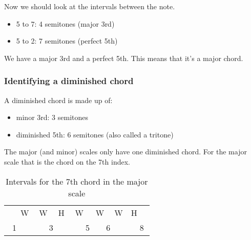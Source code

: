 Now we should look at the intervals between the note.

\begin{itemize}
	\item 5 to 7: 4 semitones (major 3rd)
	\item 5 to 2: 7 semitones (perfect 5th)
\end{itemize}

We have a major 3rd and a perfect 5th. This means that it's a major chord.

\subsubsection{Identifying a diminished chord} \label{sec:identifying_dimished_chords_in_the_scale}

A diminished chord is made up of:

\begin{itemize}
	\item minor 3rd: 3 semitones
	\item diminished 5th: 6 semitones (also called a tritone)
\end{itemize}


The major (and minor) scales only have one diminished chord. For the major scale that is the chord on the 7th index.

\begin{table}[h]
	\centering
	\begin{tabular}{*{16}{c}}
		& \multicolumn{2}{P{4mm}}{\large{W}} & \multicolumn{2}{P{4mm}}{\large{W}} & \multicolumn{2}{P{4mm}}{\large{H}} & \multicolumn{2}{P{4mm}}{\large{W}} & \multicolumn{2}{P{4mm}}{\large{W}} & \multicolumn{2}{P{4mm}}{\large{W}} & \multicolumn{2}{P{4mm}}{\large{H}} & \\
		\multicolumn{2}{P{4mm}}{1} & \multicolumn{2}{P{4mm}}{\ScaleCellFill 2} & \multicolumn{2}{P{4mm}}{3} & \multicolumn{2}{P{4mm}}{\ScaleCellFill 4} & \multicolumn{2}{P{4mm}}{5} & \multicolumn{2}{P{4mm}}{6} & \multicolumn{2}{P{4mm}}{\ScaleRootCellFill 7} & \multicolumn{2}{P{4mm}}{8}
	\end{tabular}
	\caption{Intervals for the 7th chord in the major scale}
	\label{tab:guitar_major_scale_7th_chord_identify}
\end{table}

